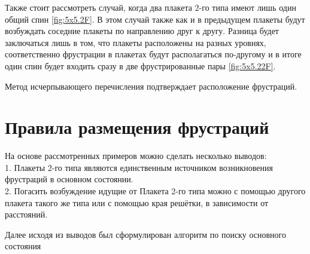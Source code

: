 \documentclass[utf8, babel, sor, jor, amsmath, amssymb, reprint]{elsarticle} %
\begin{document}
Также стоит рассмотреть случай, когда два плакета 2-го типа имеют лишь один общий спин \ref{fig:5x5.2F}.
В этом случай также как и в предыдущем плакеты будут возбуждать соседние плакеты по направлению друг к другу. Разница будет заключаться лишь в том, что плакеты расположены на разных уровнях, соответственно фрустрации в плакетах будут располагаться по-другому и в итоге один спин будет входить сразу в две фрустрированные пары \ref{fig:5x5.22F}.

Метод исчерпывающего перечисления подтверждает расположение фрустраций.

\section{Правила размещения фрустраций}

На основе рассмотренных примеров можно сделать несколько выводов: \\
1. Плакеты 2-го типа являются единственным источником возникновения фрустраций в основном состоянии.\\
2. Погасить возбуждение идущие от Плакета 2-го типа можно с помощью другого плакета такого же типа или с помощью края решётки, в зависимости от расстояний.

Далее исходя из выводов был сформулирован алгоритм по поиску основного состояния
\end{document}
